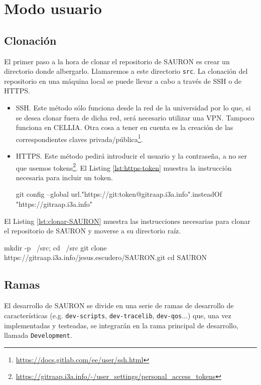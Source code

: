 \chapter{Modo usuario}\label{sec:cap2}

\section{Clonación}
El primer paso a la hora de clonar el repositorio de SAURON es crear un directorio donde albergarlo. Llamaremos a este directorio \verb|src|. La clonación del repositorio en una máquina local se puede llevar a cabo a través de SSH o de HTTPS.

\begin{itemize}
    \item SSH. Este método sólo funciona desde la red de la universidad por lo que, si se desea clonar fuera de dicha red, será necesario utilizar una VPN. Tampoco funciona en CELLIA. Otra cosa a tener en cuenta es la creación de las correspondientes claves privada/pública\footnote{\url{https://docs.gitlab.com/ee/user/ssh.html}}.
    \item HTTPS. Este método pedirá introducir el usuario y la contraseña, a no ser que usemos tokens\footnote{\url{https://gitraap.i3a.info/-/user_settings/personal_access_tokens}}. El Listing \ref{lst:https-token} muestra la instrucción necesaria para incluir un token.

    \begin{mycode}[style=bashstyle, label=lst:https-token, caption={Instrucción para incluir un token.}]
git config --global url."https://git:token@gitraap.i3a.info".insteadOf "https://gitraap.i3a.info"
    \end{mycode}
\end{itemize}

El Listing \ref{lst:clonar-SAURON} muestra las instrucciones necesarias para clonar el repositorio de SAURON y moverse a su directorio raíz.

\begin{mycode}[style=bashstyle, label=lst:clonar-SAURON, caption={Instrucción para incluir un token.}]
mkdir -p ~/src; cd ~/src
git clone https://gitraap.i3a.info/jesus.escudero/SAURON.git
cd SAURON
\end{mycode}

\section{Ramas}
El desarrollo de SAURON se divide en una serie de ramas de desarrollo de características (e.g. \verb|dev-scripts|, \verb|dev-tracelib|, \verb|dev-qos|...) que, una vez implementadas y testeadas, se integrarán en la rama principal de desarrollo, llamada \verb|Development|. 

